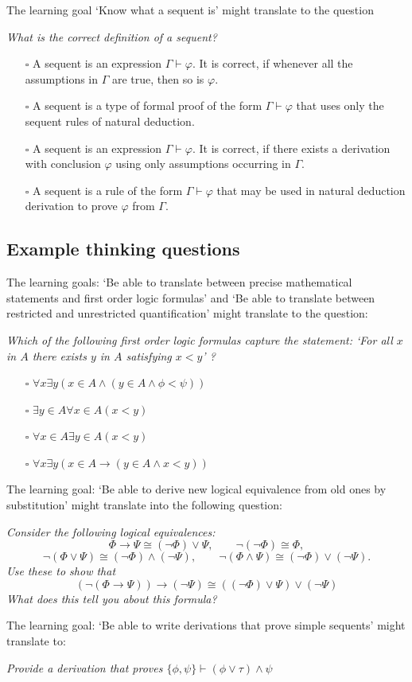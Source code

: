 \documentclass{article}[12pt]
\begin{document}
The learning goal `Know what a sequent is' might translate to the question

\emph{What is the correct definition of a sequent?}
\begin{itemize}
    \item[$\square$] A sequent is an expression $\Gamma \vdash \varphi$. It is correct, if whenever all the assumptions in $\Gamma$ are true, then so is $\varphi$.
    \item[] \item[$\square$]  A sequent is a type of formal proof of the form $\Gamma \vdash \varphi$ that uses only the sequent rules of natural deduction.
    \item[$\square$] A sequent is an expression $\Gamma \vdash \varphi$. It is correct, if there exists a derivation with conclusion $\varphi$ using only assumptions occurring in $\Gamma$.
    \item[$\square$]  A sequent is a rule of the form $\Gamma \vdash \varphi$ that may be used in natural deduction derivation to prove $\varphi$ from $\Gamma$.
\end{itemize}

\subsection{Example thinking questions}
The learning goals: `Be able to translate between precise mathematical statements and first order logic formulas' and `Be able to translate between restricted and unrestricted quantification' might translate to the question:

\emph{Which of the following first order logic formulas capture the statement: `For all $x$ in $A$ there exists $y$ in $A$ satisfying $x < y$' ?}
\begin{itemize}
    \item[$\square$] $ \forall x \exists y ( x \in A \wedge (y \in A \wedge \phi < \psi)) $
    \item[$\square$] $ \exists y \in A \forall x \in A (x < y) $ 
    \item[$\square$] $ \forall x \in A \exists y \in A (x < y) $
    \item[$\square$] $ \forall x \exists y (x \in A \rightarrow (y \in A \wedge x < y)) $
\end{itemize}

The learning goal: `Be able to derive new logical equivalence from old ones by substitution' might translate into the following question:

\emph{Consider the following logical equivalences: 
$$\Phi \rightarrow \Psi \cong (\neg \Phi) \vee \Psi, \qquad
 \neg (\neg \Phi) \cong \Phi,  $$
 $$\neg (\Phi \vee \Psi) \cong (\neg \Phi) \wedge (\neg \Psi), \qquad \neg (\Phi \wedge \Psi) \cong (\neg \Phi) \vee (\neg \Psi).$$ 
 Use these to show that
$$ (\neg (\Phi \rightarrow \Psi)) \rightarrow (\neg \Psi) \cong ((\neg \Phi) \vee \Psi) \vee (\neg \Psi) $$ 
What does this tell you about this formula?
}

The learning goal: `Be able to write derivations that prove simple sequents' might translate to:

\emph{Provide a derivation that proves $\{ \phi, \psi \} \vdash (\phi \vee \tau) \wedge \psi$}
\end{document}

